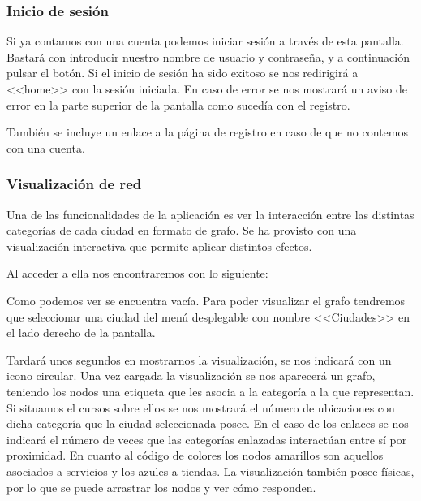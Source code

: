 \subsubsection{Inicio de sesión}


Si ya contamos con una cuenta podemos iniciar sesión a través de esta pantalla. Bastará con introducir nuestro nombre de usuario y contraseña, y a continuación pulsar el botón. Si el inicio de sesión ha sido exitoso se nos redirigirá a <<home>> con la sesión iniciada. En caso de error se nos mostrará un aviso de error en la parte superior de la pantalla como sucedía con el registro.

También se incluye un enlace a la página de registro en caso de que no contemos con una cuenta.
\subsubsection{Visualización de red}

Una de las funcionalidades de la aplicación es ver la interacción entre las distintas categorías de cada ciudad en formato de grafo. Se ha provisto con una visualización interactiva que permite aplicar distintos efectos.

Al acceder a ella nos encontraremos con lo siguiente:


Como podemos ver se encuentra vacía. Para poder visualizar el grafo tendremos que seleccionar una ciudad del menú desplegable con nombre <<Ciudades>> en el lado derecho de la pantalla.


Tardará unos segundos en mostrarnos la visualización, se nos indicará con un icono circular. Una vez cargada la visualización se nos aparecerá un grafo, teniendo los nodos una etiqueta que les asocia a la categoría a la que representan. Si situamos el cursos sobre ellos se nos mostrará el número de ubicaciones con dicha categoría que la ciudad seleccionada posee. En el caso de los enlaces se nos indicará el número de veces que las categorías enlazadas interactúan entre sí por proximidad. En cuanto al código de colores los nodos amarillos son aquellos asociados a servicios y los azules a tiendas. La visualización también posee físicas, por lo que se puede arrastrar los nodos y ver cómo responden.

